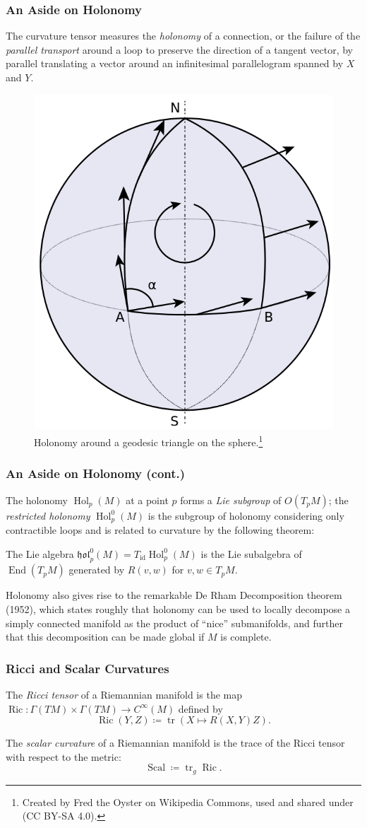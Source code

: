 \documentclass[handout]{beamer}
\DeclareMathOperator{\End}{End}
\DeclareMathOperator{\id}{id}
\DeclareMathOperator{\trace}{tr}
\DeclareMathOperator{\Hol}{Hol}
\DeclareMathOperator{\Ric}{Ric}
\DeclareMathOperator{\Scal}{Scal}
\theoremstyle{definition}
\begin{document}
\begin{frame}
    \frametitle{An Aside on Holonomy}

    The curvature tensor measures the \emph{holonomy} of a connection,
    or the failure of the \emph{parallel transport} around a loop to preserve
    the direction of a tangent vector, by parallel translating a vector around
    an infinitesimal parallelogram spanned by $X$ and $Y$.
    \begin{figure}
        \centering
        \includegraphics[width=.25\textwidth]{images/Parallel_Transport.svg.png}
        \caption{Holonomy around a geodesic triangle on the sphere.\footnote{Created
        by Fred the Oyster on Wikipedia Commons, used and shared under (CC BY-SA 4.0).}}
    \end{figure}
\end{frame}

\begin{frame}
    \frametitle{An Aside on Holonomy (cont.)}

    The holonomy $\Hol_p(M)$ at a point $p$ forms a \emph{Lie subgroup} of $O(T_pM)$;
    the \emph{restricted holonomy} $\Hol_p^0(M)$ is the subgroup of holonomy considering
    only contractible loops and is related to curvature by the following theorem:
    \begin{theorem}
        The Lie algebra $\mathfrak{hol}_p^0(M) = T_{\id}\Hol_p^0(M)$ is the Lie subalgebra
        of $\End(T_pM)$ generated by $R(v,w)$ for $v, w \in T_pM$.
    \end{theorem}

    \pause
    Holonomy also gives rise to the remarkable De Rham Decomposition theorem (1952),
    which states roughly that holonomy can be used to locally decompose a simply
    connected manifold as the product of ``nice'' submanifolds, and further that
    this decomposition can be made global if $M$ is complete.
\end{frame}

\begin{frame}
    \frametitle{Ricci and Scalar Curvatures}

    \begin{definition}
        The \emph{Ricci tensor} of a Riemannian manifold is the map
        $\Ric : \Gamma(TM) \times \Gamma(TM) \to C^\infty(M)$ defined by
        \[
            \Ric(Y,Z) \coloneqq \trace(X \mapsto R(X,Y)Z).
        \]
    \end{definition}

    \begin{definition}
        The \emph{scalar curvature} of a Riemannian manifold is the trace of the
        Ricci tensor with respect to the metric:
        \[
          \Scal \coloneqq \trace_g \Ric.
        \]
    \end{definition}
\end{frame}
\end{document}
